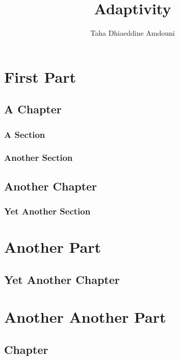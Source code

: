 \documentclass[
  twoside,
  11pt, a4paper,
  footinclude=true,
  headinclude=true,
  cleardoublepage=empty
]{scrbook}
\title{Adaptivity}
\author{Taha Dhiaeddine Amdouni}
\begin{document}
\maketitle

\clearpage

\clearpage

\clearpage

\clearpage

\clearpage


\part{First Part}

\chapter{A Chapter}
\lipsum[1] %

\section{A Section}
\lipsum[1] %

\section{Another Section}
\lipsum[1] %

\chapter{Another Chapter}
\lipsum[1] %

\section{Yet Another Section}
\lipsum[1] %

\part{Another Part}

\chapter{Yet Another Chapter}
\lipsum[1] %
  
\part{Another Another Part}
\chapter{Chapter}
\lipsum[1]
    
\end{document}
